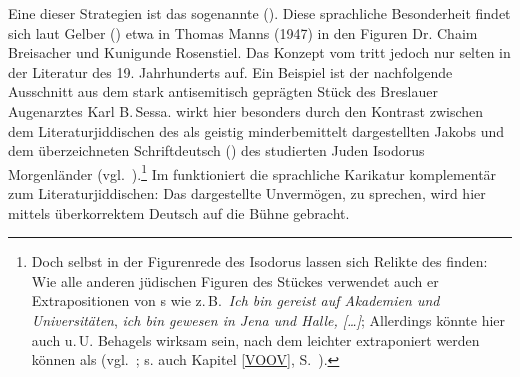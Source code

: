   Eine dieser Strategien ist das sogenannte  (\citealt[174–175]{Gelber1986}). Diese sprachliche Besonderheit findet sich laut Gelber (\citeyear[174–175]{Gelber1986}) etwa in Thomas Manns  (1947) in den Figuren Dr. Chaim Breisacher und Kunigunde Rosenstiel. Das Konzept vom  tritt jedoch nur selten in der Literatur des 19. Jahrhunderts auf. Ein Beispiel ist der nachfolgende Ausschnitt aus dem stark antisemitisch geprägten Stück  des Breslauer Augenarztes Karl B.\,Sessa.  wirkt hier besonders durch den Kontrast zwischen dem Literaturjiddischen des als geistig minderbemittelt dargestellten Jakobs und dem  überzeichneten Schriftdeutsch () des studierten Juden Isodorus Morgenländer (vgl.\, \citealt[174–175]{Gelber1986}).\footnote{Doch selbst in der Figurenrede des Isodorus lassen sich Relikte des \hai{{\LiJi}} finden: Wie alle anderen jüdischen Figuren des Stückes verwendet auch er Extrapositionen von s wie z.\,B.\, \textit{Ich bin gereist auf Akademien und Universitäten}, \textit{ich bin gewesen in Jena und Halle, […]}; Allerdings könnte hier auch u.\,U. Behagels  wirksam sein, nach dem  leichter extraponiert werden können als  (vgl.\, \citealt{Behaghel1909}; s. auch Kapitel \ref{VOOV}, S.\, \pageref{VOOV}).} Im  funktioniert die sprachliche Karikatur komplementär zum Literaturjiddischen: Das dargestellte Unvermögen,  zu sprechen, wird hier mittels überkorrektem Deutsch auf die Bühne gebracht.  

